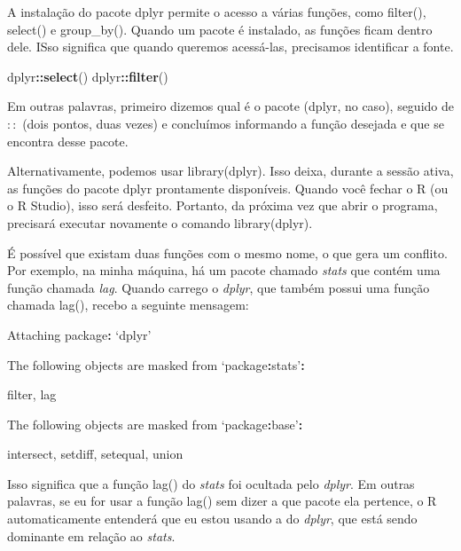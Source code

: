 \documentclass[
]{book}
\newenvironment{Shaded}{\begin{snugshade}}{\end{snugshade}}
\newcommand{\KeywordTok}[1]{\textcolor[rgb]{0.13,0.29,0.53}{\textbf{#1}}}
\newcommand{\NormalTok}[1]{#1}
\newcommand{\OperatorTok}[1]{\textcolor[rgb]{0.81,0.36,0.00}{\textbf{#1}}}
\newcommand{\StringTok}[1]{\textcolor[rgb]{0.31,0.60,0.02}{#1}}
\begin{document}
A instalação do pacote dplyr permite o acesso a várias funções, como filter(), select() e group\_by(). Quando um pacote é instalado, as funções ficam dentro dele. ISso significa que quando queremos acessá-las, precisamos identificar a fonte.

\begin{Shaded}
\begin{Highlighting}[]
\NormalTok{dplyr}\OperatorTok{::}\KeywordTok{select}\NormalTok{()}
\NormalTok{dplyr}\OperatorTok{::}\KeywordTok{filter}\NormalTok{()}
\end{Highlighting}
\end{Shaded}

Em outras palavras, primeiro dizemos qual é o pacote (dplyr, no caso), seguido de \(::\) (dois pontos, duas vezes) e concluímos informando a função desejada e que se encontra desse pacote.

Alternativamente, podemos usar library(dplyr). Isso deixa, durante a sessão ativa, as funções do pacote dplyr prontamente disponíveis. Quando você fechar o R (ou o R Studio), isso será desfeito. Portanto, da próxima vez que abrir o programa, precisará executar novamente o comando library(dplyr).

É possível que existam duas funções com o mesmo nome, o que gera um conflito. Por exemplo, na minha máquina, há um pacote chamado \emph{stats} que contém uma função chamada \emph{lag}. Quando carrego o \emph{dplyr}, que também possui uma função chamada lag(), recebo a seguinte mensagem:

\begin{Shaded}
\begin{Highlighting}[]
\NormalTok{Attaching package}\OperatorTok{:}\StringTok{ }\NormalTok{‘dplyr’}

\NormalTok{The following objects are masked from ‘package}\OperatorTok{:}\NormalTok{stats’}\OperatorTok{:}

\StringTok{    }\NormalTok{filter, lag}

\NormalTok{The following objects are masked from ‘package}\OperatorTok{:}\NormalTok{base’}\OperatorTok{:}

\StringTok{    }\NormalTok{intersect, setdiff, setequal, union}
\end{Highlighting}
\end{Shaded}

Isso significa que a função lag() do \emph{stats} foi ocultada pelo \emph{dplyr}. Em outras palavras, se eu for usar a função lag() sem dizer a que pacote ela pertence, o R automaticamente entenderá que eu estou usando a do \emph{dplyr}, que está sendo dominante em relação ao \emph{stats}.
\end{document}
